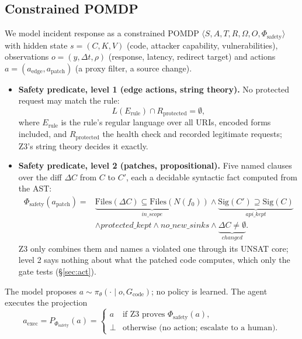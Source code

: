 \documentclass[10pt,a4paper]{article}
\newcommand{\phisafe}{\ensuremath{\Phi_{\mathrm{safety}}}}
\begin{document}
\subsection{Constrained POMDP}
We model incident response as a constrained POMDP $\langle S, A, T, R, \Omega, O, \phisafe \rangle$ with hidden state $s = (C, K, V)$ (code, attacker capability, vulnerabilities), observations $o = (y, \Delta t, \rho)$ (response, latency, redirect target) and actions $a = (a_{\mathrm{edge}}, a_{\mathrm{patch}})$ (a proxy filter, a source change).
\begin{itemize}
\item \textbf{Safety predicate, level 1 (edge actions, string theory).} No protected request may match the rule:
\begin{equation}
L(E_{\mathrm{rule}}) \cap R_{\mathrm{protected}} = \emptyset,
\end{equation}
where $E_{\mathrm{rule}}$ is the rule's regular language over all URIs, encoded forms included, and $R_{\mathrm{protected}}$ the health check and recorded legitimate requests; Z3's string theory decides it exactly.
\item \textbf{Safety predicate, level 2 (patches, propositional).} Five named clauses over the diff $\Delta C$ from $C$ to $C'$, each a decidable syntactic fact computed from the AST:
\begin{equation}
\begin{split}
\phisafe(a_{\mathrm{patch}}) = {} & \underbrace{\mathrm{Files}(\Delta C) \subseteq \mathrm{Files}(N(f_0))}_{\mathit{in\_scope}} \wedge \underbrace{\mathrm{Sig}(C') \supseteq \mathrm{Sig}(C)}_{\mathit{api\_kept}}\\
& \wedge \mathit{protected\_kept} \wedge \mathit{no\_new\_sinks} \wedge \underbrace{\Delta C \neq \emptyset}_{\mathit{changed}}.
\end{split}
\end{equation}
Z3 only combines them and names a violated one through its UNSAT core; level 2 says nothing about what the patched code computes, which only the gate tests (\S\ref{sec:act}).
\end{itemize}
The model proposes $a \sim \pi_\theta(\cdot \mid o, G_{\mathrm{code}})$; no policy is learned. The agent executes the projection
\begin{equation}
a_{\mathrm{exec}} = P_{\phisafe}(a) =
\begin{cases}
a & \text{if Z3 proves } \phisafe(a),\\
\bot & \text{otherwise (no action; escalate to a human).}
\end{cases}
\end{equation}
\end{document}
